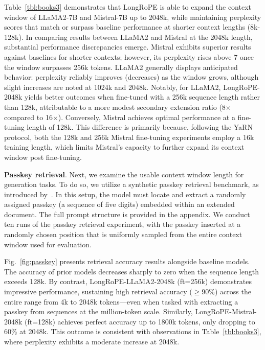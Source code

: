 Table~\ref{tbl:books3} demonstrates that LongRoPE is able to expand the context window of LLaMA2-7B and Mistral-7B up to 2048k, while maintaining perplexity scores that match or surpass baseline performance at shorter context lengths (8k-128k). In comparing results between LLaMA2 and Mistral at the 2048k length, substantial performance discrepancies emerge. Mistral exhibits superior results against baselines for shorter contexts; however, its perplexity rises above 7 once the window surpasses 256k tokens. LLaMA2 generally displays anticipated behavior: perplexity reliably improves (decreases) as the window grows, although slight increases are noted at 1024k and 2048k. Notably, for LLaMA2, LongRoPE-2048k yields better outcomes when fine-tuned with a 256k sequence length rather than 128k, attributable to a more modest secondary extension ratio (8$\times$ compared to 16$\times$). Conversely, Mistral achieves optimal performance at a fine-tuning length of 128k. This difference is primarily because, following the YaRN protocol, both the 128k and 256k Mistral fine-tuning experiments employ a 16k training length, which limits Mistral’s capacity to further expand its context window post fine-tuning.

\textbf{Passkey retrieval}. Next, we examine the usable context window length for generation tasks. To do so, we utilize a synthetic passkey retrieval benchmark, as introduced by~\cite{passkey}. In this setup, the model must locate and extract a randomly assigned passkey (a sequence of five digits) embedded within an extended document. The full prompt structure is provided in the appendix. We conduct ten runs of the passkey retrieval experiment, with the passkey inserted at a randomly chosen position that is uniformly sampled from the entire context window used for evaluation.

Fig.~\ref{fig:passkey} presents retrieval accuracy results alongside baseline models. The accuracy of prior models decreases sharply to zero when the sequence length exceeds 128k. By contrast, LongRoPE-LLaMA2-2048k (ft=256k) demonstrates impressive performance, sustaining high retrieval accuracy ($\ge$90\%) across the entire range from 4k to 2048k tokens—even when tasked with extracting a passkey from sequences at the million-token scale. Similarly, LongRoPE-Mistral-2048k (ft=128k) achieves perfect accuracy up to 1800k tokens, only dropping to 60\% at 2048k. This outcome is consistent with observations in Table~\ref{tbl:books3}, where perplexity exhibits a moderate increase at 2048k.

